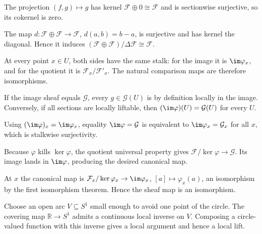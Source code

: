 \begin{solution}[Exercise 16]
The projection $(f,g)\mapsto g$ has kernel $\mathcal F\oplus0\cong\mathcal F$ and is sectionwise surjective, so its cokernel is zero.
\end{solution}

\begin{solution}[Exercise 17]
The map $d:\mathcal F\oplus\mathcal F\to\mathcal F$, $d(a,b)=b-a$, is surjective and has kernel the diagonal. Hence it induces $(\mathcal F\oplus\mathcal F)/\Delta\mathcal F\cong\mathcal F$.
\end{solution}

\begin{solution}[Exercise 18]
At every point $x\in U$, both sides have the same stalk: for the image it is $\im\varphi_x$, and for the quotient it is $\mathcal F_x/\mathcal F'_x$. The natural comparison maps are therefore isomorphisms.
\end{solution}

\begin{solution}[Exercise 19]
If the image sheaf equals $\mathcal G$, every $g\in\mathcal G(U)$ is by definition locally in the image. Conversely, if all sections are locally liftable, then $(\im\varphi)(U)=\mathcal G(U)$ for every $U$.
\end{solution}

\begin{solution}[Exercise 20]
Using $(\im\varphi)_x=\im\varphi_x$, equality $\im\varphi=\mathcal G$ is equivalent to $\im\varphi_x=\mathcal G_x$ for all $x$, which is stalkwise surjectivity.
\end{solution}

\begin{solution}[Exercise 21]
Because $\varphi$ kills $\ker\varphi$, the quotient universal property gives $\mathcal F/\ker\varphi\to\mathcal G$. Its image lands in $\im\varphi$, producing the desired canonical map.
\end{solution}

\begin{solution}[Exercise 22]
At $x$ the canonical map is $\mathcal F_x/\ker\varphi_x\to\im\varphi_x$, $[a]\mapsto\varphi_x(a)$, an isomorphism by the first isomorphism theorem. Hence the sheaf map is an isomorphism.
\end{solution}

\begin{solution}[Exercise 23]
Choose an open arc $V\subseteq S^1$ small enough to avoid one point of the circle. The covering map $\mathbb R\to S^1$ admits a continuous local inverse on $V$. Composing a circle-valued function with this inverse gives a local argument and hence a local lift.
\end{solution}

